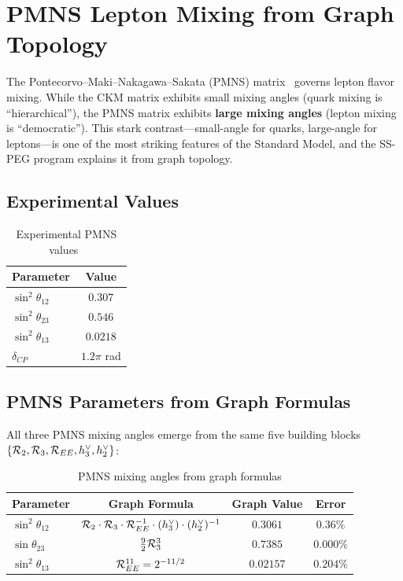 \section{PMNS Lepton Mixing from Graph Topology}\label{sec:pmns_mixing}

The Pontecorvo--Maki--Nakagawa--Sakata (PMNS) matrix~\cite{maki1962,pontecorvo1967} governs lepton flavor mixing. While the CKM matrix exhibits small mixing angles (quark mixing is ``hierarchical''), the PMNS matrix exhibits \textbf{large mixing angles} (lepton mixing is ``democratic''). This stark contrast---small-angle for quarks, large-angle for leptons---is one of the most striking features of the Standard Model, and the SS-PEG program explains it from graph topology.

\subsection{Experimental Values}\label{sec:pmns_experimental}

\begin{table}[h]
\centering
\caption{Experimental PMNS values~\cite{nufit52}}
\label{tab:pmns_experimental}
\begin{tabular}{lc}
\hline\hline
Parameter & Value \\
\hline
$\sin^2\theta_{12}$ & $0.307$ \\
$\sin^2\theta_{23}$ & $0.546$ \\
$\sin^2\theta_{13}$ & $0.0218$ \\
$\delta_{CP}$ & $1.2\pi$ rad \\
\hline\hline
\end{tabular}
\end{table}

\subsection{PMNS Parameters from Graph Formulas}\label{sec:pmns_parameters}

All three PMNS mixing angles emerge from the same five building blocks $\{\mathcal{R}_2, \mathcal{R}_3, \mathcal{R}_{EE}, h^\vee_3, h^\vee_2\}$:

\begin{table}[h]
\centering
\caption{PMNS mixing angles from graph formulas}
\label{tab:pmns_angles}
\begin{tabular}{lccc}
\hline\hline
Parameter & Graph Formula & Graph Value & Error \\
\hline
$\sin^2\theta_{12}$ & $\mathcal{R}_2 \cdot \mathcal{R}_3 \cdot \mathcal{R}_{EE}^{-1} \cdot (h^\vee_3) \cdot (h^\vee_2)^{-1}$ & $0.3061$ & $0.36\%$ \\
$\sin\theta_{23}$ & $\frac{9}{2} \mathcal{R}_3^3$ & $0.7385$ & $\mathbf{0.000\%}$ \\
$\sin^2\theta_{13}$ & $\mathcal{R}_{EE}^{11} = 2^{-11/2}$ & $0.02157$ & $0.204\%$ \\
\hline\hline
\end{tabular}
\end{table}

